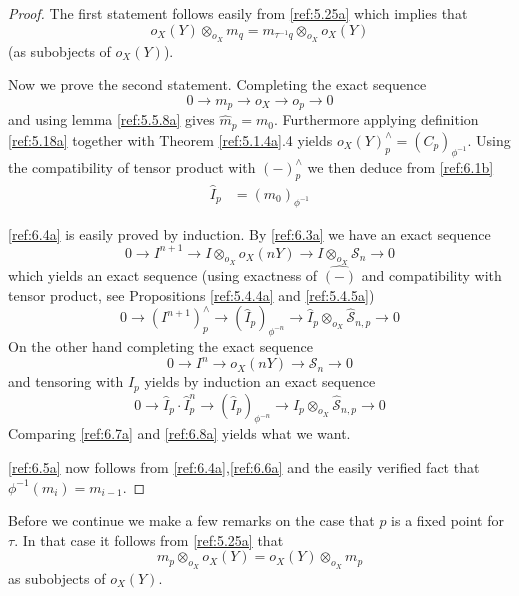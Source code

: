 \documentclass{amsproc}
\def\Sscr{{\mathcal S}}
\def\r{\rightarrow}
\theoremstyle{definition}
\theoremstyle{remark}
\numberwithin{equation}{section}
\numberwithin{table}{section}
\numberwithin{figure}{section}
\begin{document}
\begin{proof}
The first statement follows easily 
 from \eqref{ref:5.25a} which implies that
\[
o_X(Y)\otimes_{o_X}  m_q=m_{\tau^{-1}q}\otimes_{o_X} o_X(Y)
\]
(as subobjects of $o_X(Y)$). 

Now we prove the second statement. 
Completing the exact sequence 
\[
0\r m_p \r o_X\r o_{p}\r 0
\]
and using lemma \ref{ref:5.5.8a} gives $\hat{m}_p=m_0$. Furthermore
applying definition \eqref{ref:5.18a} together with Theorem
\ref{ref:5.1.4a}.4 yields $o_X(Y)^\wedge_p=(C_p)_{\phi^{-1}}$. 
Using the compatibility of tensor product with $(-)^\wedge_p$ we then deduce
from \eqref{ref:6.1b}
\begin{align}
\label{ref:6.6a}
\hat{I}_p&=(m_0)_{\phi^{-1}}
\end{align}

\eqref{ref:6.4a} is easily proved by induction. By
\eqref{ref:6.3a}
 we have an exact sequence
\[
0\r I^{n+1}\r {I}\otimes_{o_X} o_X(nY)\r {I}\otimes_{o_X} \Sscr_n\r 0
\]
which yields  an exact sequence (using exactness of $\hat{(-)}$ and
compatibility with tensor product, see Propositions
\ref{ref:5.4.4a} and \ref{ref:5.4.5a})
\begin{equation}
\label{ref:6.7a}
0\r (I^{n+1})^\wedge_p \r (\hat{I}_p)_{\phi^{-n}}
\r  \hat{I}_p\otimes_{o_X} \hat{\Sscr}_{n,p}\r 0
\end{equation}
On the other hand completing the exact sequence
\[
0\r I^{n}\r o_X(nY)\r  \Sscr_n\r 0
\]
and tensoring with $\hat{I}_p$ yields by induction an exact sequence
\begin{equation}
\label{ref:6.8a}
0\r \hat{I}_p\cdot \hat{I}^{n}_p
\r (\hat{I}_p)_{\phi^{-n}}
\r  \hat{I}_p\otimes_{o_X} \hat{\Sscr}_{n,p}\r 0
\end{equation}
Comparing \eqref{ref:6.7a} and \eqref{ref:6.8a} yields what we want.

\eqref{ref:6.5a} now follows from \eqref{ref:6.4a},\eqref{ref:6.6a} and the
easily verified fact that  $\phi^{-1}(m_i)=m_{i-1}$.
\end{proof}

Before we continue we make a few remarks on the case that $p$ is a
fixed point for $\tau$. In that case it follows from \eqref{ref:5.25a} that
\begin{equation}
\label{ref:6.9a}
m_p\otimes_{o_X} o_X(Y)=o_X(Y)\otimes_{o_X} m_p
\end{equation}
 as subobjects of
$o_X(Y)$.
\end{document}
